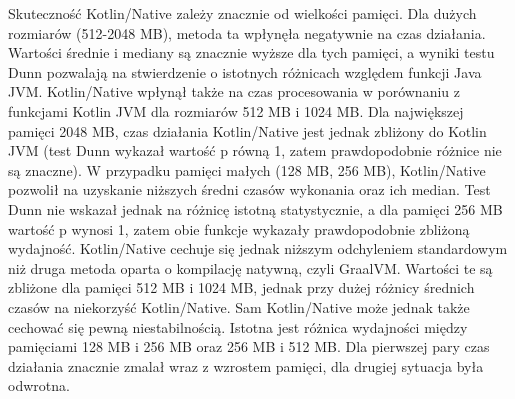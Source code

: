 Skuteczność Kotlin/Native zależy znacznie od wielkości pamięci.
Dla dużych rozmiarów (512-2048 MB), metoda ta wpłynęła negatywnie na czas działania.
Wartości średnie i mediany są znacznie wyższe dla tych pamięci, a wyniki testu Dunn pozwalają na stwierdzenie o istotnych różnicach względem funkcji Java JVM. 
Kotlin/Native wpłynął także na czas procesowania w porównaniu z funkcjami Kotlin JVM dla rozmiarów 512 MB i 1024 MB.
Dla największej pamięci 2048 MB, czas działania Kotlin/Native jest jednak zbliżony do Kotlin JVM (test Dunn wykazał wartość p równą 1, zatem prawdopodobnie różnice nie są znaczne).
W przypadku pamięci małych (128 MB, 256 MB), Kotlin/Native pozwolił na uzyskanie niższych średni czasów wykonania oraz ich median.
Test Dunn nie wskazał jednak na różnicę istotną statystycznie, a dla pamięci 256 MB wartość p wynosi 1, zatem obie funkcje wykazały prawdopodobnie zbliżoną wydajność.
Kotlin/Native cechuje się jednak niższym odchyleniem standardowym niż druga metoda oparta o kompilację natywną, czyli GraalVM.
Wartości te są zbliżone dla pamięci 512 MB i 1024 MB, jednak przy dużej różnicy średnich czasów na niekorzyść Kotlin/Native.
Sam Kotlin/Native może jednak także cechować się pewną niestabilnością.
Istotna jest różnica wydajności między pamięciami 128 MB i 256 MB oraz 256 MB i 512 MB.
Dla pierwszej pary czas działania znacznie zmalał wraz z wzrostem pamięci, dla drugiej sytuacja była odwrotna.

